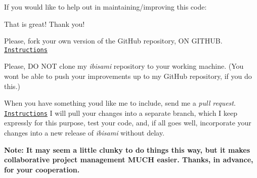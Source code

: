 If you would like to help out in maintaining/improving this code\+:
\begin{DoxyItemize}
\item That is great! Thank you!
\item Please, fork your own version of the Git\+Hub repository, O\+N G\+I\+T\+H\+U\+B. \href{https://help.github.com/articles/fork-a-repo/}{\tt Instructions}
\item Please, D\+O N\+O\+T clone my {\itshape ibisami} repository to your working machine. (You won\textquotesingle{}t be able to push your improvements up to my Git\+Hub repository, if you do this.)
\item When you have something you\textquotesingle{}d like me to include, send me a {\itshape pull request}. \href{https://help.github.com/articles/creating-a-pull-request/}{\tt Instructions} I will pull your changes into a separate branch, which I keep expressly for this purpose, test your code, and, if all goes well, incorporate your changes into a new release of {\itshape ibisami} without delay.
\end{DoxyItemize}

{\bfseries Note\+: It may seem a little clunky to do things this way, but it makes collaborative project management M\+U\+C\+H easier. Thanks, in advance, for your cooperation.} 